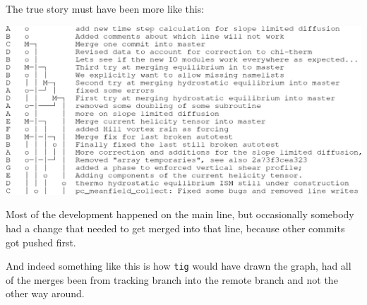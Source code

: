 \documentclass[12pt,pdftex]{article}
\begin{document}
The true story must have been more like this:

\includegraphics[width=.97\linewidth]{git-better-history.pdf}

Most of the development happened on the main line, but occasionally
somebody had a change that needed to get merged into that line, because
other commits got pushed first.

And indeed something like this is how \texttt{tig} would have drawn the graph,
had all of the merges been from tracking branch into the remote branch
and not the other way around.
\end{document}
